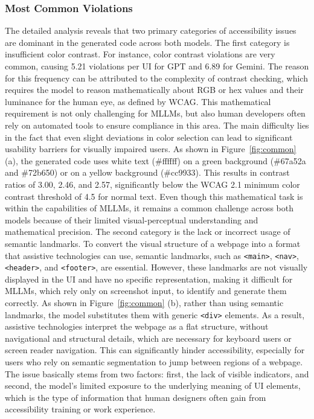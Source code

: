 \subsubsection{Most Common Violations}
The detailed analysis reveals that two primary categories of accessibility
issues are dominant in the generated code across both models.
The first category is insufficient color contrast. For instance,
color contrast violations are very common, causing 5.21 violations 
per UI for GPT and 6.89 for Gemini. The reason for this frequency 
can be attributed to the complexity of contrast checking, which 
requires the model to reason mathematically about RGB or hex values
and their luminance for the human eye, as defined by WCAG. This mathematical 
requirement is not only challenging for MLLMs, but also human 
developers often rely on automated tools to ensure compliance 
in this area. The main difficulty lies in the fact that 
even slight deviations in color selection can lead to significant 
usability barriers for visually impaired users. As shown in 
Figure~\ref{fig:common} (a), the generated code uses white text 
(\#ffffff) on a green background (\#67a52a and \#72b650)
or on a yellow background (\#cc9933). This results in 
contrast ratios of 3.00, 2.46, and 2.57, significantly below the
WCAG 2.1 minimum color contrast threshold of 4.5 for normal text.
Even though this mathematical task is within the capabilities of 
MLLMs, it remains a common challenge across both models because 
of their limited visual-perceptual understanding and mathematical 
precision.\newline
The second category is the lack or incorrect usage of semantic 
landmarks. To convert 
the visual structure of a webpage into a format that
assistive technologies can use, semantic landmarks, 
such as \texttt{<main>}, \texttt{<nav>},
\texttt{<header>}, and \texttt{<footer>}, are essential. 
However, these landmarks are not visually 
displayed in the UI and have no specific representation, making it 
difficult for MLLMs, which rely only on screenshot input,
to identify and generate them correctly. As 
shown in Figure~\ref{fig:common} (b), rather than using 
semantic landmarks, the model substitutes them with 
generic \texttt{<div>} elements. As a result, assistive technologies 
interpret the webpage as a flat structure, without navigational 
and structural details, which are necessary for keyboard users or 
screen reader navigation. This can significantly hinder 
accessibility, especially for users who rely on 
semantic segmentation to jump between regions of a webpage. 
The issue basically stems from two factors: first, the lack of 
visible indicators, and second, the model’s limited exposure to 
the underlying meaning of UI elements, which is the type of 
information that human designers often gain from accessibility training or work experience.

